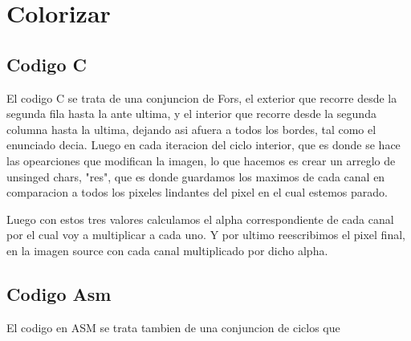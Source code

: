 \section{Colorizar}

\subsection{Codigo C}
	El codigo C se trata de una conjuncion de Fors, el exterior que recorre desde la segunda fila hasta la ante ultima,  y el interior que recorre desde la segunda columna hasta la ultima, dejando asi afuera a todos los bordes, tal como el enunciado decia. Luego en cada iteracion del ciclo interior, que es donde se hace las opearciones que modifican la imagen, lo que hacemos es crear un arreglo de unsinged chars, "res", que es  donde guardamos los maximos de cada canal en comparacion a todos  los pixeles lindantes del pixel en el cual estemos parado.
	\begin{itemize}
	\item {Res [0] $\leftarrow$ MaximoLindantesAzul
	\item {Res [1] $\leftarrow$ MaximoLindantesVerde}
	\item {Res [2] $\leftarrow$ MaximoLindantesRojo}
	\end{itemize}
Luego con estos tres valores calculamos el alpha correspondiente de cada canal por el cual voy a multiplicar a cada uno. Y por ultimo reescribimos el pixel final, en la imagen source con cada canal multiplicado  por dicho alpha.

\subsection{Codigo Asm}
	El codigo en ASM se trata tambien de una conjuncion de ciclos que 
